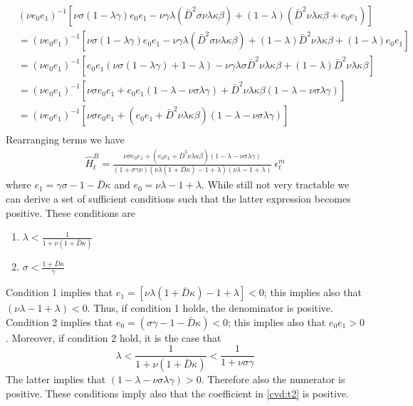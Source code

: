 \documentclass[a4paper,12pt]{article}%
\begin{document}
\begin{align*}
&(\nu e_0e_1)^{-1}\left[\nu \sigma(1-\lambda \gamma) e_0e_1 -  \nu \gamma\lambda(\bar{D}^2 \sigma\nu \lambda \kappa \beta) + (1-\lambda) (\bar{D}^2 \nu \lambda \kappa \beta+ e_0e_1) \right]\\
&=(\nu e_0e_1)^{-1}\left[\nu \sigma(1-\lambda \gamma) e_0e_1 -  \nu \gamma\lambda(\bar{D}^2 \sigma\nu \lambda \kappa \beta) + (1-\lambda) \bar{D}^2 \nu \lambda \kappa \beta + (1-\lambda)e_0e_1 \right]\\
&=(\nu e_0e_1)^{-1}\left[e_0e_1(\nu \sigma(1-\lambda \gamma)+ 1-\lambda)  -  \nu \gamma\lambda\sigma\bar{D}^2\nu \lambda \kappa \beta + (1-\lambda) \bar{D}^2 \nu \lambda \kappa \beta \right]\\
&=(\nu e_0e_1)^{-1}\left[\nu \sigma e_0e_1+ e_0e_1(1-\lambda-\nu \sigma\lambda \gamma) + \bar{D}^2 \nu \lambda \kappa \beta(1-\lambda-\nu \sigma\lambda \gamma)  \right]\\
&=(\nu e_0e_1)^{-1}\left[\nu \sigma e_0e_1+ (e_0e_1 + \bar{D}^2 \nu \lambda \kappa \beta)(1-\lambda-\nu \sigma\lambda \gamma)  \right]\\
\end{align*}
Rearranging terms we have 
\begin{align}
\hat{H}^B_{t}  = \frac{\nu \sigma e_0e_1+ (e_0e_1 + \bar{D}^2 \nu \lambda \kappa \beta)(1-\lambda-\nu \sigma\lambda \gamma)}{(1 + \sigma\gamma\nu)(\nu\lambda(1+{\bar{D}}\kappa) -1+\lambda)( \nu \lambda -1+\lambda)} \ \epsilon^m_{t} \label{cvd:t1}
\end{align}
where $e_1=\gamma\sigma-1-{\bar{D}}\kappa$ and $e_0 = \nu \lambda -1+\lambda$. While still not very tractable we can derive a set of sufficient conditions such that the latter expression becomes positive. These conditions are 
\begin{enumerate}
\item $\lambda < \frac{1}{1+\nu(1+\bar{D}\kappa)}$%
\item $\sigma < \frac{1+\bar{D}\kappa}{\gamma}$%
 \end{enumerate}
Condition 1 implies that $e_1=[\nu\lambda  (1+\bar{D}\kappa)  - 1 + \lambda]<0$; this implies also that $(\nu\lambda - 1 + \lambda)<0$. Thus, if condition 1 holds, the denominator is positive.
Condition 2 implies that $e_0 = (\sigma\gamma-1-\bar{D}\kappa)<0$; this implies also that $e_0e_1>0$. Moreover, if condition 2 hold, it is the case that 
$$ \lambda < \frac{1}{1+\nu(1+\bar{D}\kappa)}< \frac{1}{1+\nu\sigma\gamma}$$
The latter implies that $(1-\lambda-\nu \sigma\lambda \gamma)>0$. Therefore also the numerator is positive. These conditions imply also that the coefficient in \eqref{cvd:t2} is positive.
\end{document}
